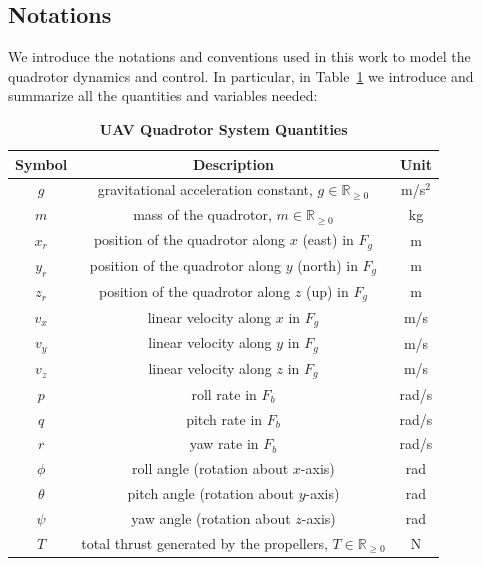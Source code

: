 \documentclass[main]{subfiles}
\begin{document}
\subsection{Notations}
We introduce the notations and conventions used in this work 
to model the quadrotor dynamics and control. 
In particular, in Table~\ref{tab:notations} we introduce and 
summarize all the quantities and variables needed:
\begin{table}[H]
    \centering
    \caption{\textbf{UAV Quadrotor System Quantities}}
    \begin{tabular}{ccc}
        \hline\hline
        \textbf{Symbol} & \textbf{Description} & \textbf{Unit} \\
        \hline
        \(g\) & gravitational acceleration constant, \( g \in \mathbb{R}_{\geq 0} \) & m/s\(^2\) \\
        \(m\) & mass of the quadrotor, \( m \in \mathbb{R}_{\geq 0} \) & kg \\
        \(x_r\) & position of the quadrotor along \(x\) (east) in \(F_g\) & m \\
        \(y_r\) & position of the quadrotor along \(y\) (north) in \(F_g\) & m \\
        \(z_r\) & position of the quadrotor along \(z\) (up) in \(F_g\) & m \\
        \(v_x\) & linear velocity along \(x\) in \(F_g\) & m/s \\
        \(v_y\) & linear velocity along \(y\) in \(F_g\) & m/s \\
        \(v_z\) & linear velocity along \(z\) in \(F_g\) & m/s \\
        \(p\) & roll rate in \(F_b\) & rad/s \\
        \(q\) & pitch rate in \(F_b\) & rad/s \\
        \(r\) & yaw rate in \(F_b\) & rad/s \\
        \(\phi\) & roll angle (rotation about \(x\)-axis) & rad \\
        \(\theta\) & pitch angle (rotation about \(y\)-axis) & rad \\
        \(\psi\) & yaw angle (rotation about \(z\)-axis) & rad \\
        \(T\) & total thrust generated by the propellers, \( T \in \mathbb{R}_{\geq 0} \) & N \\
        \hline\hline
    \end{tabular}
    \label{tab:notations}
\end{table}
\end{document}
